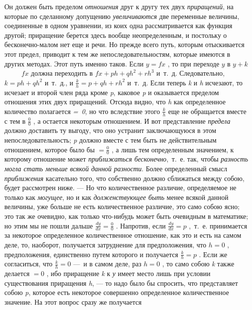 {Он должен быть пределом {\em отношения} друг к другу тех
двух {\em приращений}, на которые по сделанному
допущению {\em увеличиваются} две переменные величины,
соединенные в одном уравнении, из коих одна рассматривается как функция
другой; приращение берется здесь вообще неопределенным, и постольку о
бесконечно-малом нет еще и речи. Но прежде всего путь, которым отыскивается
этот предел, приводит к тем же непоследовательностям, которые имеются в
других методах. Этот путь именно таков. Если  $y=\mathit{fx}$ , то при
переходе  $y$ {\em  }в  $y+k$  \ \ \ \ \  $\mathit{fx}$
 должна переходить в  $\mathit{fx}+\mathit{ph}+qh^2+rh^3$  и~т.~д.
Следовательно,  $k=\mathit{ph}+qh^2$  и~т.~д., и  $\frac k
h=p+\mathit{qh}+rh^2$  и~т.~д. Если теперь {\em k} и
{\em h} исчезают, то исчезает и второй член ряда кроме
{\em p}, каковое {\em p} и
оказывается пределом отношения этих двух приращений. Отсюда видно, что
{\em h} как определенное количество полагается
{\em =~0}, но что вследствие
этого  $\frac k h$  еще не обращается вместе с тем в  $\frac 0 0$ , а
остается некоторым отношением. И вот представление
{\em предела} должно доставить ту выгоду, что оно
устранит заключающуюся в этом непоследовательность;
{\em p} должно вместе с тем быть не действительным
отношением, которое было бы  $=\frac 0 0$ , а лишь тем определенным
значением, к которому отношение может {\em приближаться
бесконечно},~т.~е. так, чтобы {\em разность могла стать
меньше всякой данной разности}. Более определенный смысл
{\em приближения} касательно того, что собственно
должно сближаться между собою, будет рассмотрен ниже. — Но что
количественное различие, определяемое не только как
{\em могущее}, но и как
{\em долженствующее быть} менее всякой данной величины,
уже больше не есть количественное различие, это само собою ясно; это так же
очевидно, как только что-нибудь может быть очевидным в математике; но этим
мы не пошли дальше  $\frac{\mathit{dy}}{\mathit{dx}}=\frac 0 0$ . Напротив,
если  $\frac{\mathit{dy}}{\mathit{dx}}=p$ ,~т.~е. принимается за некоторое
определенное количественное отношение, как это и есть на самом деле, то,
наоборот, получается затруднение для предположения, что  $h=0$ ,
предположения, единственно путем которого и получается  $\frac k h=p$ .
Если же согласиться, что $\frac k h=0$  —~и в самом деле, раз  $h=0$ , то
само собою {\em k} также делается  $=0$ , ибо
приращение {\em k} к {\em у} имеет
место лишь при условии существования приращения
{\em h}, — то надо было бы спросить, что представляет
собою {\em p}, которое есть некоторое совершенно
определенное количественное значение. На этот вопрос сразу же получается
}
